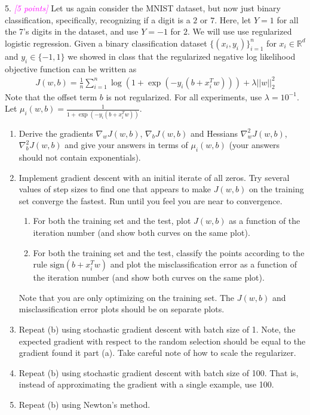 \documentclass{article}
\newcommand{\field}[1]{\mathbb{#1}}
\newcommand{\1}{\mathbf{1}}
\newcommand{\R}{\field{R}} %
\newcommand{\grade}[1]{\small\textcolor{magenta}{\emph{[#1 points]}} \normalsize}
\begin{document}
5. \grade{5} Let us again consider the MNIST dataset, but now just binary classification, specifically, recognizing if a digit is a $2$ or $7$.
Here, let $Y=1$ for all the 7's digits in the dataset, and use $Y=-1$ for $2$.
We will use use regularized logistic regression. 
Given a binary classification dataset $\{(x_i,y_i)\}_{i=1}^n$ for $x_i \in \R^d$ and $y_i \in \{-1,1\}$ we showed in class that the regularized negative log likelihood objective function can be written as
\begin{align*}
J(w,b) = \frac{1}{n} \sum_{i=1}^n \log( 1 + \exp(-y_i (b + x_i^T w))) + \lambda ||w||_2^2
\end{align*} 
Note that the offset term $b$ is not regularized. 
For all experiments, use $\lambda = 10^{-1}$. 
Let $\mu_i(w,b) = \frac{1}{1+ \exp(-y_i (b + x_i^T w))}$. 
\begin{enumerate}
  \item Derive the gradients $\nabla_w J(w,b)$, $\nabla_{b} J(w,b)$ and Hessians $\nabla_w^2 J(w,b)$, $\nabla_{b}^2 J(w,b)$ and give your answers in terms of $\mu_i(w,b)$ (your answers should not contain exponentials).
  \item Implement gradient descent with an initial iterate of all zeros. Try several values of step sizes to find one that appears to make $J(w,b)$ on the training set converge the fastest. Run until you feel you are near to convergence.
  \begin{enumerate}
    \item For both the training set and the test, plot $J(w,b)$ as a function of the iteration number (and show both curves on the same plot).  
    \item For both the training set and the test, classify the points according to the rule $\text{sign}(b + x_i^T w)$ and plot the misclassification error as a function of the iteration number (and show both curves on the same plot). 
  \end{enumerate}
  Note that you are only optimizing on the training set. The $J(w,b)$ and misclassification error plots should be on separate plots.
  \item Repeat (b) using stochastic gradient descent with batch size of 1. Note, the expected gradient with respect to the random selection should be equal to the gradient found it part (a). Take careful note of how to scale the regularizer.
  \item Repeat (b) using stochastic gradient descent with batch size of 100. That is, instead of approximating the gradient with a single example, use 100.
  \item Repeat (b) using Newton's method.  
\end{enumerate}
\end{document}
